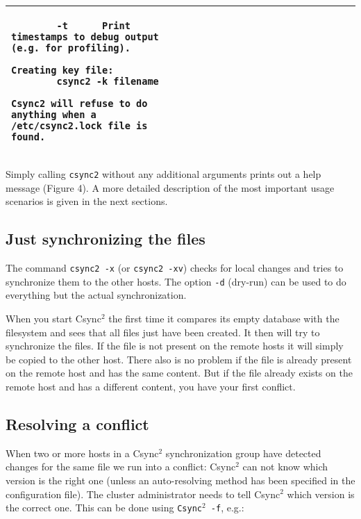 \documentclass[a4paper,twocolumn]{article}
\def\csync2{{\sc Csync$^{2}$}}
\begin{document}
\begin{figure*}[t]
\begin{center}
\begin{tabular}{|p{0.5\linewidth}|p{0.5\linewidth}|}
\begin{tiny}
\begin{verbatim}
        -t      Print timestamps to debug output (e.g. for profiling).

Creating key file:
        csync2 -k filename

Csync2 will refuse to do anything when a /etc/csync2.lock file is found.
\end{verbatim}
\end{tiny}
      \tabularnewline
      \hline
    \end{tabular}
  \end{center}
  \caption{The \csync2 help message}
\end{figure*}


Simply calling {\tt csync2} without any additional arguments prints out a
help message (Figure 4). A more detailed description of the most
important usage scenarios is given in the next sections.

\subsection{Just synchronizing the files}

The command {\tt csync2 -x} (or {\tt csync2 -xv}) checks for local changes and
tries to synchronize them to the other hosts. The option {\tt -d} (dry-run) can
be used to do everything but the actual synchronization.

When you start \csync2 the first time it compares its empty database with the
filesystem and sees that all files just have been created. It then will try
to synchronize the files. If the file is not present on the remote hosts it
will simply be copied to the other host. There also is no problem if the file
is already present on the remote host and has the same content. But if the
file already exists on the remote host and has a different content, you
have your first conflict.

\subsection{Resolving a conflict}

When two or more hosts in a \csync2 synchronization group have detected changes
for the same file we run into a conflict: \csync2 can not know which version is
the right one (unless an auto-resolving method has been specified in the
configuration file). The cluster administrator needs to tell \csync2 which
version is the correct one. This can be done using {\tt \csync2 -f}, e.g.:
\end{document}
